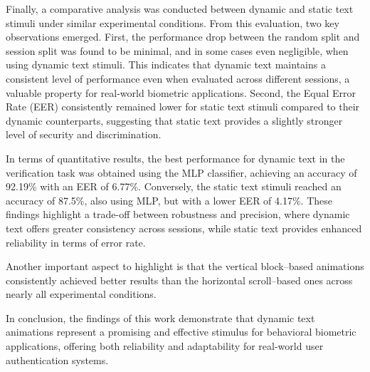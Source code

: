 \documentclass{article}
\begin{document}
Finally, a comparative analysis was conducted between dynamic and static text stimuli under similar experimental conditions.
From this evaluation, two key observations emerged.
First, the performance drop between the random split and session split was found to be minimal, and in some cases even negligible, when using dynamic text stimuli.
This indicates that dynamic text maintains a consistent level of performance even when evaluated across different sessions, a valuable property for real-world biometric applications.
Second, the Equal Error Rate (EER) consistently remained lower for static text stimuli compared to their dynamic counterparts, suggesting that static text provides a slightly stronger level of security and discrimination.

In terms of quantitative results, the best performance for dynamic text in the verification task was obtained using the MLP classifier, achieving an accuracy of 92.19\% with an EER of 6.77\%.
Conversely, the static text stimuli reached an accuracy of 87.5\%, also using MLP, but with a lower EER of 4.17\%.
These findings highlight a trade-off between robustness and precision, where dynamic text offers greater consistency across sessions, while static text provides enhanced reliability in terms of error rate.

Another important aspect to highlight is that the vertical block–based animations consistently achieved better results than the horizontal scroll–based ones across nearly all experimental conditions.

In conclusion, the findings of this work demonstrate that dynamic text animations represent a promising and effective stimulus for behavioral biometric applications, offering both reliability and adaptability for real-world user authentication systems.

\newpage
\end{document}
